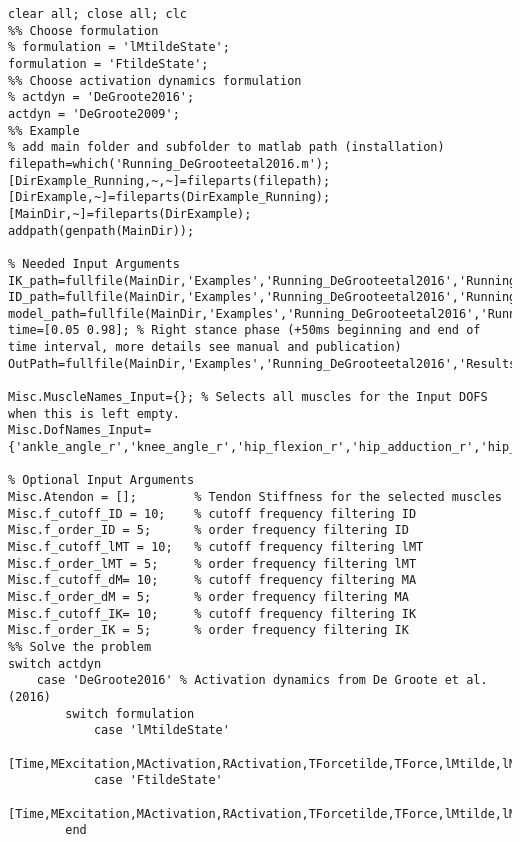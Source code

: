 \documentclass[a4paper,oneside,11pt]{article}
\begin{document}
\begin{lstlisting}[frame=none,basicstyle=\tiny]
clear all; close all; clc
%% Choose formulation
% formulation = 'lMtildeState';
formulation = 'FtildeState';
%% Choose activation dynamics formulation
% actdyn = 'DeGroote2016';
actdyn = 'DeGroote2009';
%% Example
% add main folder and subfolder to matlab path (installation)
filepath=which('Running_DeGrooteetal2016.m');
[DirExample_Running,~,~]=fileparts(filepath); [DirExample,~]=fileparts(DirExample_Running);[MainDir,~]=fileparts(DirExample);
addpath(genpath(MainDir));

% Needed Input Arguments
IK_path=fullfile(MainDir,'Examples','Running_DeGrooteetal2016','RunningData','IK_Joggen_1.mot');
ID_path=fullfile(MainDir,'Examples','Running_DeGrooteetal2016','RunningData','ID_Joggen_1.sto');
model_path=fullfile(MainDir,'Examples','Running_DeGrooteetal2016','RunningData','AdDB_Scaled_FB_FA.osim');
time=[0.05 0.98]; % Right stance phase (+50ms beginning and end of time interval, more details see manual and publication)
OutPath=fullfile(MainDir,'Examples','Running_DeGrooteetal2016','Results');

Misc.MuscleNames_Input={}; % Selects all muscles for the Input DOFS when this is left empty.
Misc.DofNames_Input={'ankle_angle_r','knee_angle_r','hip_flexion_r','hip_adduction_r','hip_rotation_r'};

% Optional Input Arguments
Misc.Atendon = [];        % Tendon Stiffness for the selected muscles
Misc.f_cutoff_ID = 10;    % cutoff frequency filtering ID
Misc.f_order_ID = 5;      % order frequency filtering ID
Misc.f_cutoff_lMT = 10;   % cutoff frequency filtering lMT
Misc.f_order_lMT = 5;     % order frequency filtering lMT
Misc.f_cutoff_dM= 10;     % cutoff frequency filtering MA
Misc.f_order_dM = 5;      % order frequency filtering MA
Misc.f_cutoff_IK= 10;     % cutoff frequency filtering IK
Misc.f_order_IK = 5;      % order frequency filtering IK
%% Solve the problem
switch actdyn
    case 'DeGroote2016' % Activation dynamics from De Groote et al. (2016)          
        switch formulation
            case 'lMtildeState'
                [Time,MExcitation,MActivation,RActivation,TForcetilde,TForce,lMtilde,lM,MuscleNames,OptInfo,DatStore]=SolveMuscleRedundancy_lMtildeState(model_path,IK_path,ID_path,time,OutPath,Misc);
            case 'FtildeState'   
                [Time,MExcitation,MActivation,RActivation,TForcetilde,TForce,lMtilde,lM,MuscleNames,OptInfo,DatStore]=SolveMuscleRedundancy_FtildeState(model_path,IK_path,ID_path,time,OutPath,Misc);
        end
        

\end{lstlisting}
\end{document}
